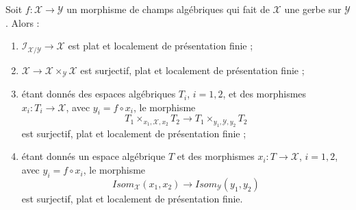 \begin{lemma}
\label{lemma-gerbe-isom-fppf}
Soit $f : \mathcal{X} \to \mathcal{Y}$ un morphisme de champs algébriques
qui fait de $\mathcal{X}$ une gerbe sur $\mathcal{Y}$. Alors :
\begin{enumerate}
\item $\mathcal{I}_{\mathcal{X}/\mathcal{Y}} \to \mathcal{X}$
est plat et localement de présentation finie ;
\item $\mathcal{X} \to \mathcal{X} \times_\mathcal{Y} \mathcal{X}$
est surjectif, plat et localement de présentation finie ;
\item étant donnés des espaces algébriques $T_i$, $i = 1, 2$, et des
morphismes $x_i : T_i \to \mathcal{X}$, avec $y_i = f \circ x_i$, le
morphisme
$$
T_1 \times_{x_1, \mathcal{X}, x_2} T_2 \longrightarrow
T_1 \times_{y_1, \mathcal{Y}, y_2} T_2
$$
est surjectif, plat et localement de présentation finie ;
\item étant donnés un espace algébrique $T$ et des morphismes
$x_i : T \to \mathcal{X}$, $i = 1, 2$, avec $y_i = f \circ x_i$, le morphisme
$$
\mathit{Isom}_\mathcal{X}(x_1, x_2) \longrightarrow
\mathit{Isom}_\mathcal{Y}(y_1, y_2)
$$
est surjectif, plat et localement de présentation finie.
\end{enumerate}
\end{lemma}

